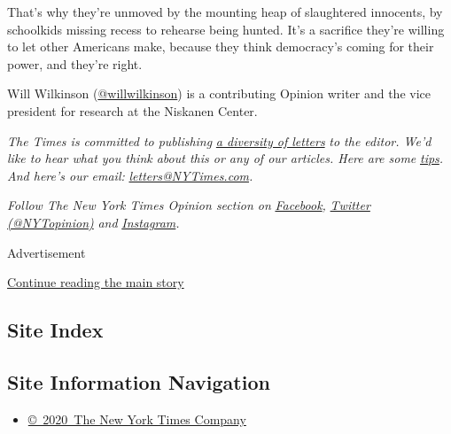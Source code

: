That's why they're unmoved by the mounting heap of slaughtered
innocents, by schoolkids missing recess to rehearse being hunted. It's a
sacrifice they're willing to let other Americans make, because they
think democracy's coming for their power, and they're right.

Will Wilkinson
(\href{https://twitter.com/willwilkinson}{@willwilkinson}) is a
contributing Opinion writer and the vice president for research at the
Niskanen Center.

\emph{The Times is committed to publishing}
\href{https://www.nytimes3xbfgragh.onion/2019/01/31/opinion/letters/letters-to-editor-new-york-times-women.html}{\emph{a
diversity of letters}} \emph{to the editor. We'd like to hear what you
think about this or any of our articles. Here are some}
\href{https://help.nytimes3xbfgragh.onion/hc/en-us/articles/115014925288-How-to-submit-a-letter-to-the-editor}{\emph{tips}}\emph{.
And here's our email:}
\href{mailto:letters@NYTimes.com}{\emph{letters@NYTimes.com}}\emph{.}

\emph{Follow The New York Times Opinion section on}
\href{https://www.facebookcorewwwi.onion/nytopinion}{\emph{Facebook}}\emph{,}
\href{http://twitter.com/NYTOpinion}{\emph{Twitter (@NYTopinion)}}
\emph{and}
\href{https://www.instagram.com/nytopinion/}{\emph{Instagram}}\emph{.}

Advertisement

\protect\hyperlink{after-bottom}{Continue reading the main story}

\hypertarget{site-index}{%
\subsection{Site Index}\label{site-index}}

\hypertarget{site-information-navigation}{%
\subsection{Site Information
Navigation}\label{site-information-navigation}}

\begin{itemize}
\tightlist
\item
  \href{https://help.nytimes3xbfgragh.onion/hc/en-us/articles/115014792127-Copyright-notice}{©~2020~The
  New York Times Company}
\end{itemize}

